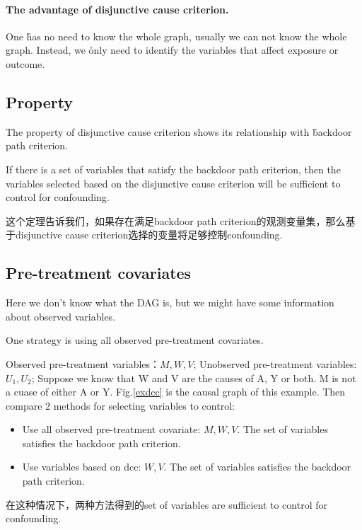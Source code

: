 \paragraph{The advantage of disjunctive cause criterion.} One \r{has no need to know the whole graph}, usually we can not know the whole graph. Instead, we \r{only need to identify the variables that affect exposure or outcome.}

\subsection{Property}
The property of disjunctive cause criterion shows its  relationship with \r{backdoor path criterion.}
\begin{thm}
	If there is a set of variables that satisfy the backdoor path criterion, then the variables selected based on the disjunctive cause criterion will be sufficient to control for confounding.
\end{thm}

这个定理告诉我们，如果存在满足backdoor path criterion的观测变量集，那么基于disjunctive cause criterion选择的变量将足够控制confounding.

\subsection{Pre-treatment covariates}
Here we don't know what the DAG is, but we might have some information about observed variables.  

One strategy is using all observed pre-treatment covariates. 

\begin{ex}
	\label{exdcc1}
	Observed pre-treatment variables：${M,W,V}$;
	Unobserved pre-treatment variables: ${U_1,U_2}$;
	Suppose we know that W and V are the causes of A, Y or both. M is not a cuase of either A or Y. Fig.\ref{exdcc} is the causal graph of this example.
 Then compare 2 methods for selecting variables to control: 
 \begin{itemize}
 	\item Use all observed pre-treatment covariate: ${M,W,V}$. The set of variables satisfies the backdoor path criterion.
 	\item Use variables based on dcc: ${W,V}$. The set of variables satisfies the backdoor path criterion.
 \end{itemize}

在这种情况下，两种方法得到的set of variables are sufficient to control for confounding.
\end{ex}

